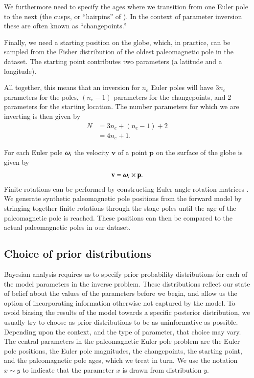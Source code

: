 \documentclass[preprint,12pt,authoryear]{elsarticle}
\newcommand{\mitbf}[1]{\hbox{\mathversion{bold}$#1$}}
\begin{document}
We furthermore need to specify the ages where we transition from 
one Euler pole to the next (the cusps, or ``hairpins'' of \citet{irving1972hairpins}).
In the context of parameter inversion these are often known as ``changepoints.''

Finally, we need a starting position on the globe, which, in practice, can be sampled
from the Fisher distribution of the oldest paleomagnetic pole in the dataset.
The starting point contributes two parameters (a latitude and a longitude).

All together, this means that an inversion for $n_e$ Euler poles will
have $3 n_e$ parameters for the poles, $(n_e-1)$ parameters for the changepoints,
and 2 parameters for the starting location.
The number parameters for which we are inverting is then given by
\begin{equation}
\begin{aligned}
N &= 3 n_e + (n_e -1) + 2 \\
 &= 4 n_e + 1.
\end{aligned}
\label{eq:n_parameters}
\end{equation}

For each Euler pole $\mitbf{\omega}_i$ the velocity $\mathbf{v}$ of a point 
$\mathbf{p}$ on the surface of the globe is given by
\begin{equation}
\mathbf{v} = \mitbf{\omega}_i \times \mathbf{p}.
\label{eq:rigid_rotation}
\end{equation}
Finite rotations can be performed by constructing Euler angle rotation matrices \citep[cf.][]{goldstein1965classical}. 
We generate synthetic paleomagnetic pole positions from the forward model by stringing together
finite rotations through the stage poles until the age of the paleomagnetic pole
is reached. These positions can then be compared to the actual paleomagnetic poles in our dataset.

\subsection{Choice of prior distributions}
\label{sec:priors}

Bayesian analysis requires us to specify prior probability distributions 
for each of the model parameters in the inverse problem.
These distributions reflect our state of belief about the values of the parameters before we begin,
and allow us the option of incorporating information otherwise not captured by the model.
To avoid biasing the results of the model towards a specific posterior distribution,
we usually try to choose as prior distributions to be as uninformative as possible. 
Depending upon the context, and the type of parameter, that choice may vary.
The central parameters in the paleomagnetic Euler pole problem are the Euler pole positions,
the Euler pole magnitudes, the changepoints, the starting point, and the paleomagnetic pole ages, which we treat in turn.
We use the notation $x \sim y$ to indicate that the parameter $x$ is drawn from distribution $y$.
\end{document}
